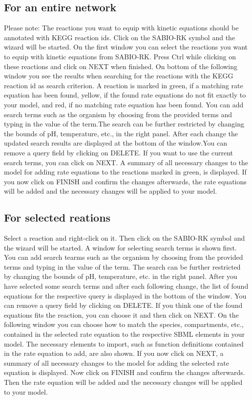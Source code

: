 \subsection{For an entire network}
Please note: The reactions you want to equip with kinetic equations should be annotated with KEGG reaction ids.
Click on the SABIO-RK symbol and the wizard will be started. On the first window you can select the reactions you want to equip with kinetic equations from SABIO-RK. Press Ctrl while clicking on these reactions and click on NEXT when finished. On bottom of the following window you see the results when searching for the reactions with the KEGG reaction id as search criterion. A reaction is marked in green, if a matching rate equation has been found, yellow, if the found rate equations do not fit exactly to your model, and red, if no matching rate equation has been found. You can add search terms such as the organism by choosing from the provided terms and typing in the value of the term.The search can be further restricted by changing the bounds of pH, temperature, etc., in the right panel. After each change the updated search results are displayed at the bottom of the window.You can remove a query field by clicking on DELETE. If you want to use the current search terms, you can click on NEXT. A summary of all necessary changes to the model for adding rate equations to the reactions marked in green, is displayed. If you now click on FINISH and confirm the changes afterwards, the rate equations will be added and the necessary changes will be applied to your model.

\subsection{For selected reations}
Select a reaction and right-click on it. Then click on the SABIO-RK symbol and the wizard will be started. A window for selecting search terms is shown first. You can add search tearms such as the organism by choosing from the provided terms and typing in the value of the term. The search can be further restricted by changing the bounds of pH, temperature, etc. in the right panel. After you have selected some search terms and after each following change, the list of found equations for the respective query is displayed in the bottom of the window. You can remove a query field by clicking on DELETE. If you think one of the found equations fits the reaction, you can choose it and then click on NEXT. On the following window you can choose how to match the species, compartments, etc., contained in the selected rate equation to the respective SBML elements in your model. The necessary elements to import, such as function definitions contained in the rate equation to add, are also shown. If you now click on NEXT, a summary of all necessary changes to the model for adding the selected rate equation is displayed. Now click on FINISH  and confirm the changes afterwards. Then the rate equation will be added and the necessary changes will be applied to your model.

